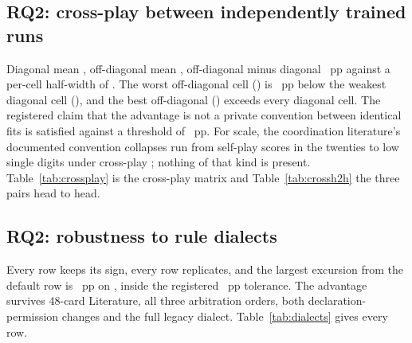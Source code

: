 \subsection{RQ2: cross-play between independently trained runs}
\label{sec:results-crossplay}

Diagonal mean \vsevenXpDiagonal{}, off-diagonal mean \vsevenXpOffDiagonal{}, off-diagonal minus
diagonal \vsevenXpGap{}~pp against a per-cell half-width of \vsevenXpHalfWidth{}. The worst off-diagonal cell
(\vsevenXpWorstOff{}) is \vsevenXpWorstOffShortfall{}~pp below the weakest diagonal cell
(\vsevenXpWeakestDiag{}), and the best off-diagonal (\vsevenXpBestOff{}) exceeds every diagonal cell.
The registered claim that the advantage is not a private convention between identical fits is
satisfied against a threshold of \vsevenStwoThreshold{}~pp. For scale, the coordination literature's
documented convention collapses run from self-play scores in the twenties to low single digits under
cross-play \cite{bard-hanabi,hu-otherplay}; nothing of that kind is present.
Table~\ref{tab:crossplay} is the cross-play matrix and Table~\ref{tab:crossh2h} the three pairs
head to head.

\begin{table}[!ht]\centering
\caption{Cross-play. Three runs of the same architecture, trained independently on disjoint fitting
banks with different search trajectories and, for one, a different starting basin; pairwise parameter
distance \vsevenXpDistanceLo{} to \vsevenXpDistanceHi{} over \vsevenCoordinates{} coordinates.}
\label{tab:crossplay}
{\tabfont}
\end{table}

\begin{table}[!ht]\centering
\caption{The three independently trained runs head to head. \vsevenHtwohSeparated{} of the three
pairs separate from zero, which is what establishes that these are distinguishable policies rather
than one policy three times.}
\label{tab:crossh2h}
{\tabfont}
\end{table}

\subsection{RQ2: robustness to rule dialects}
\label{sec:results-dialects}

Every row keeps its sign, every row replicates, and the largest excursion from the default row is
\vsevenDiaMaxExcursion{}~pp on \vsevenDiaMaxExcursionRow{}, inside the registered
\vsevenSfiveTolerance{}~pp tolerance. The advantage survives 48-card Literature, all three
arbitration orders, both declaration-permission changes and the full legacy dialect.
Table~\ref{tab:dialects} gives every row.

